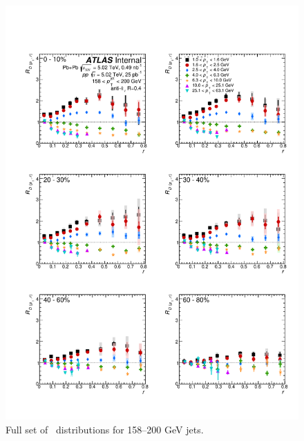 \begin{figure}[h]
\includegraphics[width=1.0\textwidth]{figures/results/RDpT_dR_jet8.pdf}
\caption{Full set of \RDptr\ distributions for 158--200 GeV jets.}
\label{fig:fullset_rptr_j8}
\end{figure}

